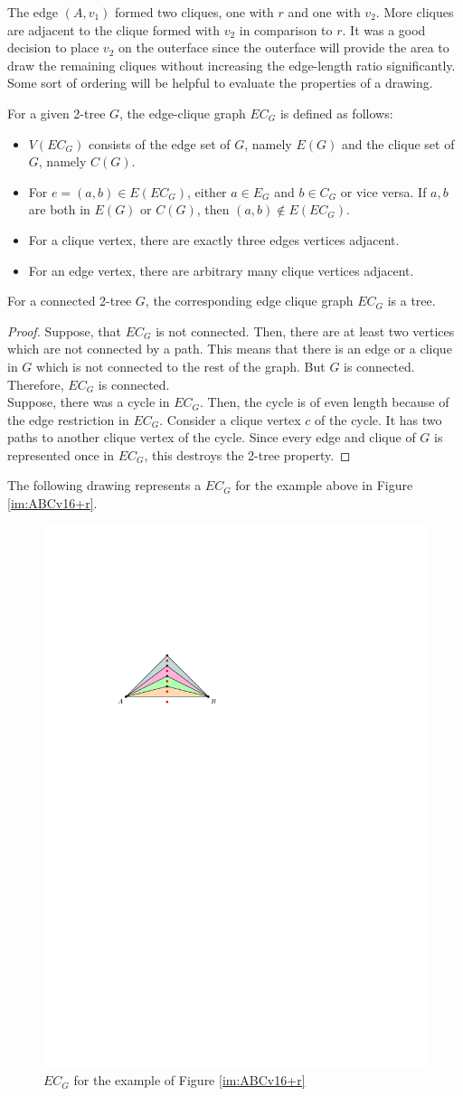 The edge $(A,v_1)$ formed two cliques, one with $r$ and one with $v_2$. More cliques are adjacent to the clique formed with $v_2$ in comparison to $r$. It was a good decision to place $v_2$ on the outerface since the outerface will provide the area to draw the remaining cliques without increasing the edge-length ratio significantly. Some sort of ordering will be helpful to evaluate the properties of a drawing.\bigskip
\begin{definition}
	For a given 2-tree $G$, the edge-clique graph $EC_G$ is defined as follows:
\end{definition}
	\begin{itemize}
	\item $V(EC_G)$ consists of the edge set of $G$, namely $E(G)$ and the clique set of $G$, namely $C(G)$.
	\item For $e = (a,b) \in  E(EC_G)$, either $a \in E_G$ and $b\in C_G$ or vice versa. If $a,b$ are both in $E(G)$ or $C(G)$, then $(a,b)\notin E(EC_G)$.
	\item For a clique vertex, there are exactly three edges vertices adjacent.
	\item For an edge vertex, there are arbitrary many clique vertices adjacent.
\end{itemize}
\begin{lemma}
	For a connected 2-tree $G$, the corresponding edge clique graph $EC_G$ is a tree.
\end{lemma}
\begin{proof}
	Suppose, that $EC_G$ is not connected. Then, there are at least two vertices which are not connected by a path. This means that there is an edge or a clique in $G$ which is not connected to the rest of the graph. But $G$ is connected. Therefore, $EC_G$ is connected.\\
	Suppose, there was a cycle in $EC_G$. Then, the cycle is of even length because of the edge restriction in $EC_G$. Consider a clique vertex $c$ of the cycle. It has two paths to another clique vertex of the cycle. Since every edge and clique of $G$ is represented once in $EC_G$, this destroys the 2-tree property.
\end{proof}
The following drawing represents a $EC_G$ for the example above in Figure \ref{im:ABCv16+r}.
\begin{figure}[H]
	\centering
	\includegraphics[width=.4\linewidth,page=19]{drawings/k-trees.pdf}
	\caption{$EC_G$ for the example of Figure \ref{im:ABCv16+r}}
\end{figure}
